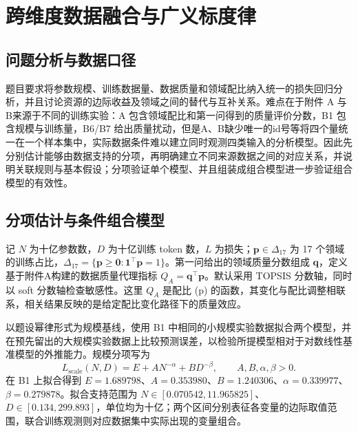 \section{跨维度数据融合与广义标度律}
\label{sec:q2}

\subsection{问题分析与数据口径}

题目要求将参数规模、训练数据量、数据质量和领域配比纳入统一的损失回归分析，并且讨论资源的边际收益及领域之间的替代与互补关系。难点在于附件 A 与 B来源于不同的训练实验：A 包含领域配比和第一问得到的质量评价分数，B1 包含规模与训练量，B6/B7 给出质量扰动，但是A、B缺少唯一的id号等将四个量统一在一个样本集中，实际数据条件难以建立同时观测四类输入的分析模型。因此先分别估计能够由数据支持的分项，再明确建立不同来源数据之间的对应关系，并说明关联规则与基本假设；分项验证单个模型、并且组装成组合模型进一步验证组合模型的有效性。

\subsection{分项估计与条件组合模型}
记 $N$ 为十亿参数数，$D$ 为十亿训练 token 数，$L$ 为损失；$\boldsymbol p\in\Delta_{17}$ 为 17 个领域的训练占比，$\Delta_{17}=\{\boldsymbol p\geq\boldsymbol 0:\boldsymbol 1^\top\boldsymbol p=1\}$。第一问给出的领域质量分数组成 $\boldsymbol q$，定义基于附件A构建的数据质量代理指标 $Q_A=\boldsymbol q^\top\boldsymbol p$。默认采用 TOPSIS 分数轴，同时以 soft 分数轴检查敏感性。这里 $Q_A$ 是配比 (\boldsymbol p) 的函数，其变化与配比调整相联系，相关结果反映的是给定配比变化路径下的质量效应。

以题设幂律形式为规模基线，使用 B1 中相同的小规模实验数据拟合两个模型，并在预先留出的大规模实验数据上比较预测误差，以检验所提模型相对于对数线性基准模型的外推能力。规模分项写为
\begin{equation}
L_{\mathrm{scale}}(N,D)=E+AN^{-\alpha}+BD^{-\beta},\qquad A,B,\alpha,\beta>0.
\label{eq:q2-scale}
\end{equation}
在 B1 上拟合得到 $E=1.689798$、$A=0.353980$、$B=1.240306$、$\alpha=0.339977$、$\beta=0.279878$。拟合支持范围为 $N\in[0.070542,11.965825]$、$D\in[0.134,299.893]$，单位均为十亿；两个区间分别表征各变量的边际取值范围，联合训练观测则对应数据集中实际出现的变量组合。


